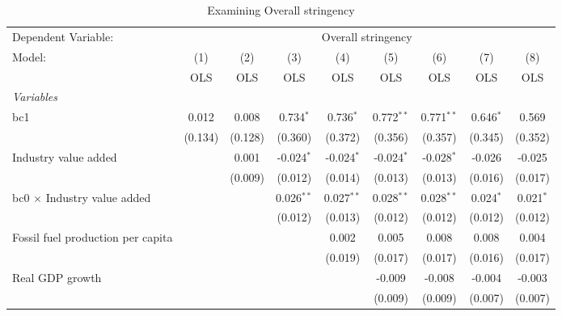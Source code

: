 
\begin{table}[htbp]
   \caption{Examining Overall stringency}
   \centering
   \begin{tabular}{lcccccccc}
      \toprule
      Dependent Variable: & \multicolumn{8}{c}{Overall stringency}\\
      Model:                                  & (1)     & (2)     & (3)          & (4)          & (5)          & (6)          & (7)         & (8)\\  
                                              &  OLS    & OLS     & OLS          & OLS          & OLS          & OLS          & OLS         & OLS\\  
      \midrule
      \emph{Variables}\\
      bc1                                     & 0.012   & 0.008   & 0.734$^{*}$  & 0.736$^{*}$  & 0.772$^{**}$ & 0.771$^{**}$ & 0.646$^{*}$ & 0.569\\   
                                              & (0.134) & (0.128) & (0.360)      & (0.372)      & (0.356)      & (0.357)      & (0.345)     & (0.352)\\   
      Industry value added                    &         & 0.001   & -0.024$^{*}$ & -0.024$^{*}$ & -0.024$^{*}$ & -0.028$^{*}$ & -0.026      & -0.025\\   
                                              &         & (0.009) & (0.012)      & (0.014)      & (0.013)      & (0.013)      & (0.016)     & (0.017)\\   
      bc0 $\times$ Industry value added       &         &         & 0.026$^{**}$ & 0.027$^{**}$ & 0.028$^{**}$ & 0.028$^{**}$ & 0.024$^{*}$ & 0.021$^{*}$\\   
                                              &         &         & (0.012)      & (0.013)      & (0.012)      & (0.012)      & (0.012)     & (0.012)\\   
      Fossil fuel production per capita       &         &         &              & 0.002        & 0.005        & 0.008        & 0.008       & 0.004\\   
                                              &         &         &              & (0.019)      & (0.017)      & (0.017)      & (0.016)     & (0.017)\\   
      Real GDP growth                         &         &         &              &              & -0.009       & -0.008       & -0.004      & -0.003\\   
                                              &         &         &              &              & (0.009)      & (0.009)      & (0.007)     & (0.007)\\   

\end{tabular}
\end{table}
